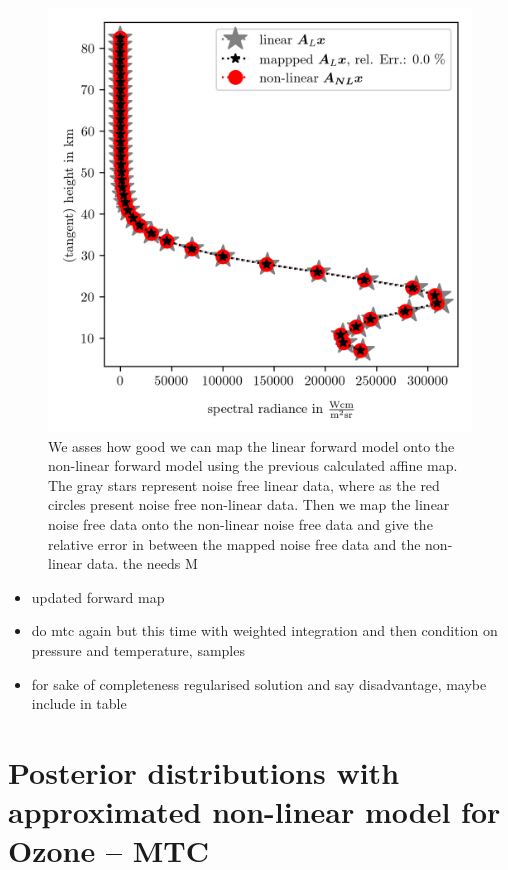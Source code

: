 \begin{figure}[ht!]
	\centering
	\includegraphics{SampMapAssesment.png}
	\caption[Assessment of affine map.]{We asses how good we can map the linear forward model onto the non-linear forward model using the previous calculated affine map. The gray stars represent noise free linear data, where as the red circles present noise free non-linear data. Then we map the linear noise free data onto the non-linear noise free data and give the relative error in between the mapped noise free data and the non-linear data. the  needs M}
	\label{fig:MapAsses}
\end{figure}


\begin{itemize}
	\item updated forward map
	\item do mtc again but this time with weighted integration and then condition on pressure and temperature, samples
	\item for sake of completeness regularised solution and say disadvantage, maybe include in table
\end{itemize}

\section{Posterior distributions with approximated non-linear model for Ozone -- MTC}
